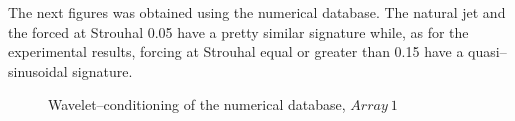 \documentclass[english]{aiaa-tc}
\begin{document}
The next figures was obtained using the numerical database. The natural jet and the forced at Strouhal 0.05 have a pretty similar signature while,
as for the experimental results, forcing at Strouhal equal or greater than 0.15 have a quasi--sinusoidal signature.

\begin{figure}[h!]
\begin{center}
\begin{centering}

\end{centering}
\caption{Wavelet--conditioning of the numerical database, $Array~1$}
\label{fig:numericalConditioning}
\end{center}
\end{figure}
\end{document}
